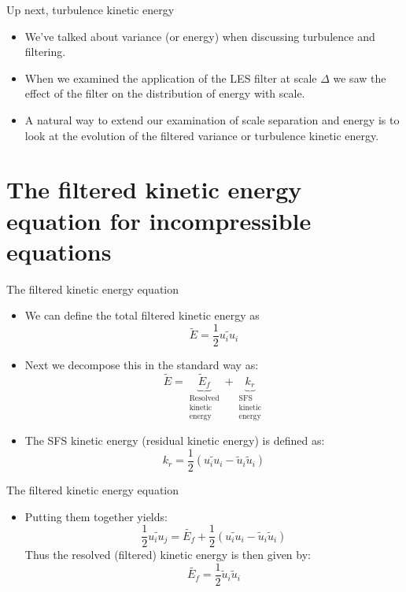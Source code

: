 
\begin{frame}{Up next, turbulence kinetic energy}

\begin{itemize}
\item We've talked about variance (or energy) when discussing turbulence and filtering.
\item When we examined the application of the LES filter at scale $\Delta$ we saw the effect of the filter on the distribution of energy with scale.
\item A natural way to extend our examination of scale separation and energy is to look at the evolution of the filtered variance or turbulence kinetic energy.
\end{itemize}

\end{frame}

\section{The filtered kinetic energy equation for incompressible equations} %

\begin{frame}{The filtered kinetic energy equation}

\begin{itemize}
\item We can define the total filtered kinetic energy as
$$\tilde E = \frac{1}{2}\widetilde{u_i u_i}$$
\item Next we decompose this in the standard way as:
$$\tilde E = \underbrace{\tilde E_f}_{\substack{\text{Resolved}\\ \text{kinetic}\\\text{energy}}} + \underbrace{k_r}_{\substack{\text{SFS}\\\text{kinetic}\\\text{energy}}}$$
\item The SFS kinetic energy (residual kinetic energy) is defined as:
$$k_r = \frac{1}{2}\left(\widetilde{u_i u_i} - \tilde u_i \tilde u_i\right)$$
\end{itemize}

\end{frame}


\begin{frame}{The filtered kinetic energy equation}

\begin{itemize}
\item Putting them together yields:
$$\frac{1}{2}\widetilde{u_i u_j} = \tilde{E_f} + \frac{1}{2}\left(\widetilde{u_i u_i} - \tilde u_i \tilde u_i\right)$$
Thus the resolved (filtered) kinetic energy is then given by:
$$\tilde{E_f} = \frac{1}{2}\tilde u_i \tilde u_i$$
\end{itemize}

\end{frame}

